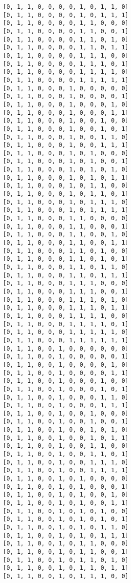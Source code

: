 \documentclass[11pt]{article}
\begin{document}
\begin{Verbatim}[commandchars=\\\{\}]
[0, 1, 1, 0, 0, 0, 0, 1, 0, 1, 1, 0]
[0, 1, 1, 0, 0, 0, 0, 1, 0, 1, 1, 1]
[0, 1, 1, 0, 0, 0, 0, 1, 1, 0, 0, 0]
[0, 1, 1, 0, 0, 0, 0, 1, 1, 0, 0, 1]
[0, 1, 1, 0, 0, 0, 0, 1, 1, 0, 1, 0]
[0, 1, 1, 0, 0, 0, 0, 1, 1, 0, 1, 1]
[0, 1, 1, 0, 0, 0, 0, 1, 1, 1, 0, 0]
[0, 1, 1, 0, 0, 0, 0, 1, 1, 1, 0, 1]
[0, 1, 1, 0, 0, 0, 0, 1, 1, 1, 1, 0]
[0, 1, 1, 0, 0, 0, 0, 1, 1, 1, 1, 1]
[0, 1, 1, 0, 0, 0, 1, 0, 0, 0, 0, 0]
[0, 1, 1, 0, 0, 0, 1, 0, 0, 0, 0, 1]
[0, 1, 1, 0, 0, 0, 1, 0, 0, 0, 1, 0]
[0, 1, 1, 0, 0, 0, 1, 0, 0, 0, 1, 1]
[0, 1, 1, 0, 0, 0, 1, 0, 0, 1, 0, 0]
[0, 1, 1, 0, 0, 0, 1, 0, 0, 1, 0, 1]
[0, 1, 1, 0, 0, 0, 1, 0, 0, 1, 1, 0]
[0, 1, 1, 0, 0, 0, 1, 0, 0, 1, 1, 1]
[0, 1, 1, 0, 0, 0, 1, 0, 1, 0, 0, 0]
[0, 1, 1, 0, 0, 0, 1, 0, 1, 0, 0, 1]
[0, 1, 1, 0, 0, 0, 1, 0, 1, 0, 1, 0]
[0, 1, 1, 0, 0, 0, 1, 0, 1, 0, 1, 1]
[0, 1, 1, 0, 0, 0, 1, 0, 1, 1, 0, 0]
[0, 1, 1, 0, 0, 0, 1, 0, 1, 1, 0, 1]
[0, 1, 1, 0, 0, 0, 1, 0, 1, 1, 1, 0]
[0, 1, 1, 0, 0, 0, 1, 0, 1, 1, 1, 1]
[0, 1, 1, 0, 0, 0, 1, 1, 0, 0, 0, 0]
[0, 1, 1, 0, 0, 0, 1, 1, 0, 0, 0, 1]
[0, 1, 1, 0, 0, 0, 1, 1, 0, 0, 1, 0]
[0, 1, 1, 0, 0, 0, 1, 1, 0, 0, 1, 1]
[0, 1, 1, 0, 0, 0, 1, 1, 0, 1, 0, 0]
[0, 1, 1, 0, 0, 0, 1, 1, 0, 1, 0, 1]
[0, 1, 1, 0, 0, 0, 1, 1, 0, 1, 1, 0]
[0, 1, 1, 0, 0, 0, 1, 1, 0, 1, 1, 1]
[0, 1, 1, 0, 0, 0, 1, 1, 1, 0, 0, 0]
[0, 1, 1, 0, 0, 0, 1, 1, 1, 0, 0, 1]
[0, 1, 1, 0, 0, 0, 1, 1, 1, 0, 1, 0]
[0, 1, 1, 0, 0, 0, 1, 1, 1, 0, 1, 1]
[0, 1, 1, 0, 0, 0, 1, 1, 1, 1, 0, 0]
[0, 1, 1, 0, 0, 0, 1, 1, 1, 1, 0, 1]
[0, 1, 1, 0, 0, 0, 1, 1, 1, 1, 1, 0]
[0, 1, 1, 0, 0, 0, 1, 1, 1, 1, 1, 1]
[0, 1, 1, 0, 0, 1, 0, 0, 0, 0, 0, 0]
[0, 1, 1, 0, 0, 1, 0, 0, 0, 0, 0, 1]
[0, 1, 1, 0, 0, 1, 0, 0, 0, 0, 1, 0]
[0, 1, 1, 0, 0, 1, 0, 0, 0, 0, 1, 1]
[0, 1, 1, 0, 0, 1, 0, 0, 0, 1, 0, 0]
[0, 1, 1, 0, 0, 1, 0, 0, 0, 1, 0, 1]
[0, 1, 1, 0, 0, 1, 0, 0, 0, 1, 1, 0]
[0, 1, 1, 0, 0, 1, 0, 0, 0, 1, 1, 1]
[0, 1, 1, 0, 0, 1, 0, 0, 1, 0, 0, 0]
[0, 1, 1, 0, 0, 1, 0, 0, 1, 0, 0, 1]
[0, 1, 1, 0, 0, 1, 0, 0, 1, 0, 1, 0]
[0, 1, 1, 0, 0, 1, 0, 0, 1, 0, 1, 1]
[0, 1, 1, 0, 0, 1, 0, 0, 1, 1, 0, 0]
[0, 1, 1, 0, 0, 1, 0, 0, 1, 1, 0, 1]
[0, 1, 1, 0, 0, 1, 0, 0, 1, 1, 1, 0]
[0, 1, 1, 0, 0, 1, 0, 0, 1, 1, 1, 1]
[0, 1, 1, 0, 0, 1, 0, 1, 0, 0, 0, 0]
[0, 1, 1, 0, 0, 1, 0, 1, 0, 0, 0, 1]
[0, 1, 1, 0, 0, 1, 0, 1, 0, 0, 1, 0]
[0, 1, 1, 0, 0, 1, 0, 1, 0, 0, 1, 1]
[0, 1, 1, 0, 0, 1, 0, 1, 0, 1, 0, 0]
[0, 1, 1, 0, 0, 1, 0, 1, 0, 1, 0, 1]
[0, 1, 1, 0, 0, 1, 0, 1, 0, 1, 1, 0]
[0, 1, 1, 0, 0, 1, 0, 1, 0, 1, 1, 1]
[0, 1, 1, 0, 0, 1, 0, 1, 1, 0, 0, 0]
[0, 1, 1, 0, 0, 1, 0, 1, 1, 0, 0, 1]
[0, 1, 1, 0, 0, 1, 0, 1, 1, 0, 1, 0]
[0, 1, 1, 0, 0, 1, 0, 1, 1, 0, 1, 1]
[0, 1, 1, 0, 0, 1, 0, 1, 1, 1, 0, 0]

\end{Verbatim}
\end{document}
